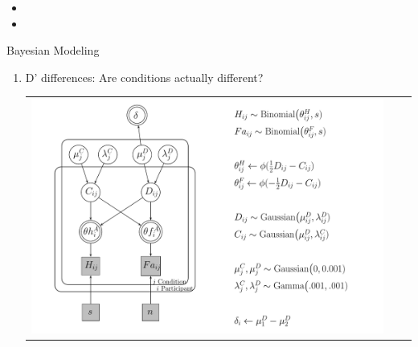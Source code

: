 \documentclass[final]{beamer}
\newlength{\onecolwid}
\newlength{\twocolwid}
\begin{document}
\begin{frame}[t]
\begin{columns}[t]
\begin{column}{\twocolwid}
\begin{columns}[t,totalwidth=\twocolwid]
\begin{column}{\onecolwid}
\begin{itemize}
\item
\item
\end{itemize}


\begin{alertblock}{Bayesian Modeling}


\begin{enumerate}
\item D' differences: Are conditions actually different?
\begin{center}
\begin{tabular}{ccc}
\includegraphics[width=0.68\linewidth]{Figures/Delta_DiffD_Model4.pdf}
\end{tabular}
\end{center}


\end{enumerate}
\end{alertblock}
\end{column}
\end{columns}
\end{column}
\end{columns}
\end{frame}
\end{document}
